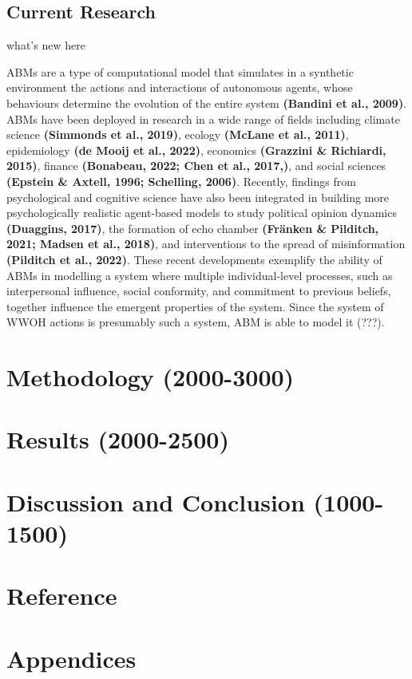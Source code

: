 \documentclass[
  11pt,
]{article}
\begin{document}
\hypertarget{current-research}{%
\subsection{Current Research}\label{current-research}}

what's new here

ABMs are a type of computational model that simulates in a synthetic
environment the actions and interactions of autonomous agents, whose
behaviours determine the evolution of the entire system \textbf{(Bandini
et al., 2009)}. ABMs have been deployed in research in a wide range of
fields including climate science \textbf{(Simmonds et al., 2019)},
ecology \textbf{(McLane et al., 2011)}, epidemiology \textbf{(de Mooij
et al., 2022)}, economics \textbf{(Grazzini \& Richiardi, 2015)},
finance \textbf{(Bonabeau, 2022; Chen et al., 2017,)}, and social
sciences \textbf{(Epstein \& Axtell, 1996; Schelling, 2006)}. Recently,
findings from psychological and cognitive science have also been
integrated in building more psychologically realistic agent-based models
to study political opinion dynamics \textbf{(Duaggins, 2017)}, the
formation of echo chamber \textbf{(Fränken \& Pilditch, 2021; Madsen et
al., 2018)}, and interventions to the spread of misinformation
\textbf{(Pilditch et al., 2022)}. These recent developments exemplify
the ability of ABMs in modelling a system where multiple
individual-level processes, such as interpersonal influence, social
conformity, and commitment to previous beliefs, together influence the
emergent properties of the system. Since the system of WWOH actions is
presumably such a system, ABM is able to model it (???).

\hypertarget{methodology-2000-3000}{%
\section{Methodology (2000-3000)}\label{methodology-2000-3000}}

\hypertarget{results-2000-2500}{%
\section{Results (2000-2500)}\label{results-2000-2500}}

\hypertarget{discussion-and-conclusion-1000-1500}{%
\section{Discussion and Conclusion
(1000-1500)}\label{discussion-and-conclusion-1000-1500}}

\hypertarget{reference}{%
\section{Reference}\label{reference}}

\hypertarget{appendices}{%
\section{Appendices}\label{appendices}}
\end{document}
